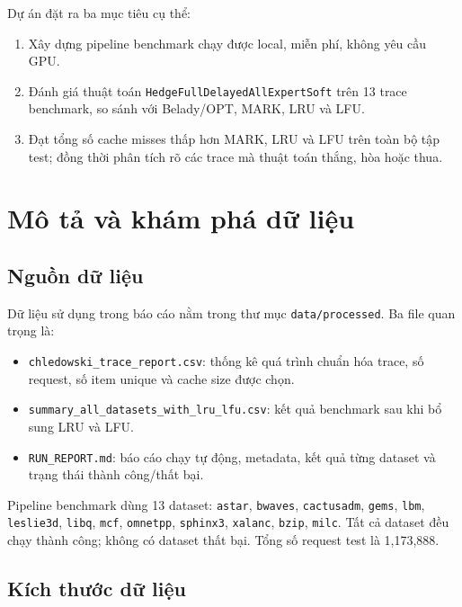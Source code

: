 \documentclass[11pt,a4paper]{article}
\newcommand{\code}[1]{\texttt{#1}}
\newcommand{\hedge}{\code{HedgeFullDelayedAllExpertSoft}}
\begin{document}
Dự án đặt ra ba mục tiêu cụ thể:

\begin{enumerate}[leftmargin=1.4em]
    \item Xây dựng pipeline benchmark chạy được local, miễn phí, không yêu cầu GPU.
    \item Đánh giá thuật toán \hedge{} trên 13 trace benchmark, so sánh với Belady/OPT, MARK, LRU và LFU.
    \item Đạt tổng số cache misses thấp hơn MARK, LRU và LFU trên toàn bộ tập test; đồng thời phân tích rõ các trace mà thuật toán thắng, hòa hoặc thua.
\end{enumerate}

\section{Mô tả và khám phá dữ liệu}

\subsection{Nguồn dữ liệu}

Dữ liệu sử dụng trong báo cáo nằm trong thư mục \code{data/processed}. Ba file quan trọng là:

\begin{itemize}[leftmargin=1.4em]
    \item \code{chledowski\_trace\_report.csv}: thống kê quá trình chuẩn hóa trace, số request, số item unique và cache size được chọn.
    \item \code{summary\_all\_datasets\_with\_lru\_lfu.csv}: kết quả benchmark sau khi bổ sung LRU và LFU.
    \item \code{RUN\_REPORT.md}: báo cáo chạy tự động, metadata, kết quả từng dataset và trạng thái thành công/thất bại.
\end{itemize}

Pipeline benchmark dùng 13 dataset: \code{astar}, \code{bwaves}, \code{cactusadm}, \code{gems}, \code{lbm}, \code{leslie3d}, \code{libq}, \code{mcf}, \code{omnetpp}, \code{sphinx3}, \code{xalanc}, \code{bzip}, \code{milc}. Tất cả dataset đều chạy thành công; không có dataset thất bại. Tổng số request test là 1,173,888.

\subsection{Kích thước dữ liệu}
\end{document}
